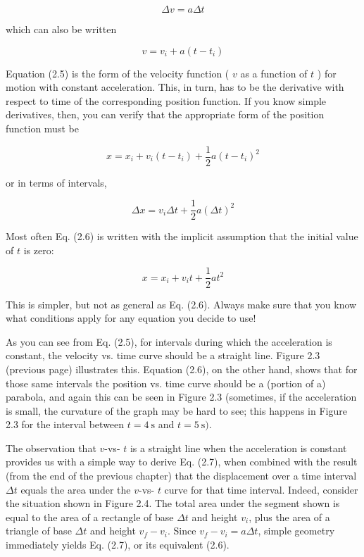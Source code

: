 \documentclass[10pt]{article}
\begin{document}
\begin{equation*}
\Delta v=a \Delta t \tag{2.4}
\end{equation*}


which can also be written


\begin{equation*}
v=v_{i}+a\left(t-t_{i}\right) \tag{2.5}
\end{equation*}


Equation (2.5) is the form of the velocity function ( $v$ as a function of $t$ ) for motion with constant acceleration. This, in turn, has to be the derivative with respect to time of the corresponding position function. If you know simple derivatives, then, you can verify that the appropriate form of the position function must be


\begin{equation*}
x=x_{i}+v_{i}\left(t-t_{i}\right)+\frac{1}{2} a\left(t-t_{i}\right)^{2} \tag{2.6}
\end{equation*}


or in terms of intervals,


\begin{equation*}
\Delta x=v_{i} \Delta t+\frac{1}{2} a(\Delta t)^{2} \tag{2.7}
\end{equation*}


Most often Eq. (2.6) is written with the implicit assumption that the initial value of $t$ is zero:


\begin{equation*}
x=x_{i}+v_{i} t+\frac{1}{2} a t^{2} \tag{2.8}
\end{equation*}


This is simpler, but not as general as Eq. (2.6). Always make sure that you know what conditions apply for any equation you decide to use!

As you can see from Eq. (2.5), for intervals during which the acceleration is constant, the velocity vs. time curve should be a straight line. Figure 2.3 (previous page) illustrates this. Equation (2.6), on the other hand, shows that for those same intervals the position vs. time curve should be a (portion of a) parabola, and again this can be seen in Figure 2.3 (sometimes, if the acceleration is small, the curvature of the graph may be hard to see; this happens in Figure 2.3 for the interval between $t=4 \mathrm{~s}$ and $t=5 \mathrm{~s})$.

The observation that $v$-vs- $t$ is a straight line when the acceleration is constant provides us with a simple way to derive Eq. (2.7), when combined with the result (from the end of the previous chapter) that the displacement over a time interval $\Delta t$ equals the area under the $v$-vs- $t$ curve for that time interval. Indeed, consider the situation shown in Figure 2.4. The total area under the segment shown is equal to the area of a rectangle of base $\Delta t$ and height $v_{i}$, plus the area of a\\
triangle of base $\Delta t$ and height $v_{f}-v_{i}$. Since $v_{f}-v_{i}=a \Delta t$, simple geometry immediately yields Eq. (2.7), or its equivalent (2.6).
\end{document}
